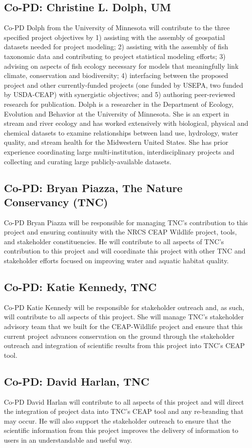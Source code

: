 \documentclass[12pt, class=article, crop=false]{standalone}
\begin{document}
\subsection*{Co-PD: Christine L. Dolph, UM}
Co-PD Dolph from the University of Minnesota will contribute to the three specified project objectives by 1) assisting with the assembly of geospatial datasets needed for project modeling; 2) assisting with the assembly of fish taxonomic data and contributing to project statistical modeling efforts; 3) advising on aspects of fish ecology necessary for models that meaningfully link climate, conservation and biodiversity; 4) interfacing between the proposed project and other currently-funded projects
(one funded by USEPA, two funded by USDA-CEAP) with synergistic objectives; and 5) authoring peer-reviewed research for publication.
Dolph is a researcher in the Department of Ecology, Evolution and Behavior at the University of Minnesota.
She is an expert in stream and river ecology and has worked extensively with biological, physical and chemical datasets to examine relationships between land use, hydrology, water quality, and stream health for the Midwestern United States.
She has prior experience coordinating large multi-institution, interdisciplinary projects and collecting and curating large publicly-available datasets.

\subsection*{Co-PD: Bryan Piazza, The Nature Conservancy (TNC)}
Co-PD Bryan Piazza will be responsible for managing TNC's contribution to this project and ensuring continuity with the NRCS CEAP Wildlife project, tools, and stakeholder constituencies.
He will contribute to all aspects of TNC's contribution to this project and will coordinate this project with other TNC and stakeholder efforts focused on improving water and aquatic habitat quality.

\subsection*{Co-PD: Katie Kennedy, TNC}
Co-PD Katie Kennedy will be responsible for stakeholder outreach and, as such, will contribute to all aspects of this project.
She will manage TNC's stakeholder advisory team that we built for the CEAP-Wildlife project and ensure that this current project advances conservation on the ground through the stakeholder outreach and integration of scientific results from this project into TNC's CEAP tool.

\subsection*{Co-PD: David Harlan, TNC}
Co-PD David Harlan will contribute to all aspects of this project and will direct the integration of project data into TNC's CEAP tool and any re-branding that may occur.
He will also support the stakeholder outreach to ensure that the scientific information from this project improves the delivery of information to users in an understandable and useful way.
\end{document}
